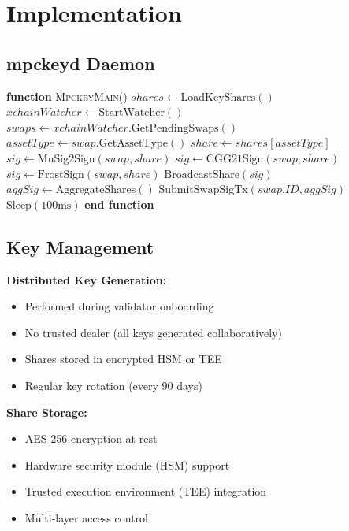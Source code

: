 \section{Implementation}


\subsection{mpckeyd Daemon}



\begin{algorithmic}[1]
\State \textbf{function} \textsc{MpckeyMain}()
    \State $shares \gets \text{LoadKeyShares}()$
    \State $xchainWatcher \gets \text{StartWatcher}()$
    \State
        \State $swaps \gets xchainWatcher.\text{GetPendingSwaps}()$
            \State $assetType \gets swap.\text{GetAssetType}()$
            \State $share \gets shares[assetType]$
            \State
                \State $sig \gets \text{MuSig2Sign}(swap, share)$
                \State $sig \gets \text{CGG21Sign}(swap, share)$
                \State $sig \gets \text{FrostSign}(swap, share)$
            \EndIf
            \State
            \State $\text{BroadcastShare}(sig)$
            \State
                \State $aggSig \gets \text{AggregateShares}()$
                \State $\text{SubmitSwapSigTx}(swap.ID, aggSig)$
            \EndIf
        \EndFor
        \State $\text{Sleep}(100\text{ms})$
    \EndWhile
\State \textbf{end function}
\end{algorithmic}


\subsection{Key Management}

\textbf{Distributed Key Generation:}
\begin{itemize}
\item Performed during validator onboarding
\item No trusted dealer (all keys generated collaboratively)
\item Shares stored in encrypted HSM or TEE
\item Regular key rotation (every 90 days)
\end{itemize}

\textbf{Share Storage:}
\begin{itemize}
\item AES-256 encryption at rest
\item Hardware security module (HSM) support
\item Trusted execution environment (TEE) integration
\item Multi-layer access control
\end{itemize}

